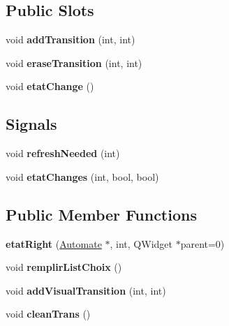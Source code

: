 \subsection*{Public Slots}
\begin{DoxyCompactItemize}
\item 
\hypertarget{classetat_right_a34b0092285d37cdcb418e65c9b0d7725}{void {\bfseries add\-Transition} (int, int)}\label{classetat_right_a34b0092285d37cdcb418e65c9b0d7725}

\item 
\hypertarget{classetat_right_aeb2508e316991470781711f57281963b}{void {\bfseries erase\-Transition} (int, int)}\label{classetat_right_aeb2508e316991470781711f57281963b}

\item 
\hypertarget{classetat_right_ac15456fc1dacf084b9bcbae7d6699627}{void {\bfseries etat\-Change} ()}\label{classetat_right_ac15456fc1dacf084b9bcbae7d6699627}

\end{DoxyCompactItemize}
\subsection*{Signals}
\begin{DoxyCompactItemize}
\item 
\hypertarget{classetat_right_ac7e6e4cff96fe796b6dcf1c4fca96e48}{void {\bfseries refresh\-Needed} (int)}\label{classetat_right_ac7e6e4cff96fe796b6dcf1c4fca96e48}

\item 
\hypertarget{classetat_right_a4ee395991e158ac64118b802d23b0962}{void {\bfseries etat\-Changes} (int, bool, bool)}\label{classetat_right_a4ee395991e158ac64118b802d23b0962}

\end{DoxyCompactItemize}
\subsection*{Public Member Functions}
\begin{DoxyCompactItemize}
\item 
\hypertarget{classetat_right_a174e152a40be3b9194125bc141b8cca6}{{\bfseries etat\-Right} (\hyperlink{class_automate}{Automate} $\ast$, int, Q\-Widget $\ast$parent=0)}\label{classetat_right_a174e152a40be3b9194125bc141b8cca6}

\item 
\hypertarget{classetat_right_a6631d8b4878cdaa7c8443c24825fd791}{void {\bfseries remplir\-List\-Choix} ()}\label{classetat_right_a6631d8b4878cdaa7c8443c24825fd791}

\item 
\hypertarget{classetat_right_a9bd49810066fc43059d2adf138784fd6}{void {\bfseries add\-Visual\-Transition} (int, int)}\label{classetat_right_a9bd49810066fc43059d2adf138784fd6}

\item 
\hypertarget{classetat_right_a181683fbe813964220ddde7a048d840c}{void {\bfseries clean\-Trans} ()}\label{classetat_right_a181683fbe813964220ddde7a048d840c}

\end{DoxyCompactItemize}
